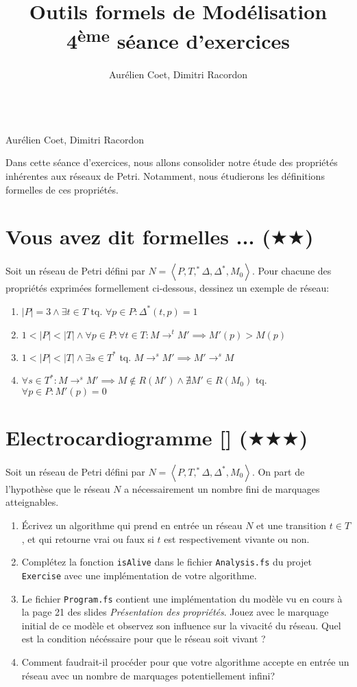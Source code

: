 \documentclass[a4paper, titlepage]{article}
\makeatletter
\numberwithin{figure}{section}
\numberwithin{table}{section}
\newcommand{\tuple}[1]{\ensuremath{\left \langle #1 \right \rangle }}
\newcommand{\card}[1]{\ensuremath{\left \vert #1 \right \vert }}
\newcommand\objective[1]{\def\@objective{#1}}
\newcommand{\makecustomtitle}{%
	\begin{center}
		\huge\@title \\
		[1ex]\small Aurélien Coet, Dimitri Racordon
	\end{center}
	\@objective
}
\makeatother
\begin{document}
  \title{Outils formels de Modélisation \\ 4\textsuperscript{ème} séance d'exercices}
  \author{Aurélien Coet, Dimitri Racordon}
	\objective{
		Dans cette séance d'exercices, nous allons consolider notre étude des propriétés inhérentes aux réseaux de Petri.
    Notamment, nous étudierons les définitions formelles de ces propriétés.
	}

	\makecustomtitle

  \section{Vous avez dit formelles ... ($\bigstar\bigstar$)}
    Soit un réseau de Petri défini par $N=\tuple{P,T,^*\Delta,\Delta^*,M_0}$.
		Pour chacune des propriétés exprimées formellement ci-dessous, dessinez un exemple de réseau:
		\begin{enumerate}
			\item $|P|=3 \wedge \exists t \in T$ tq. $\forall p \in P: \Delta^*(t,p) = 1$
			\item $1 < \card{P} < \card{T} \wedge \forall p \in P: \forall t \in T: M \rightarrow^t M' \implies M'(p) > M(p)$
      \item $1 < \card{P} < \card{T} \wedge \exists s \in T^*$ tq. $M \rightarrow^s M' \implies M' \rightarrow^s M$
      \item $\forall s \in T^*: M \rightarrow^s M' \implies M \notin R(M') \wedge \nexists M' \in R(M_0)$ tq. $\forall p \in P: M'(p) = 0$
		\end{enumerate}

	\section{Electrocardiogramme [\Keyboard] ($\bigstar\bigstar\bigstar$)}
    Soit un réseau de Petri défini par $N=\tuple{P,T,^*\Delta,\Delta^*,M_0}$.
    On part de l'hypothèse que le réseau $N$ a nécessairement un nombre fini de marquages atteignables.
    
    \begin{enumerate}
        \item Écrivez un algorithme qui prend en entrée un réseau $N$ et une transition $t \in T$, et qui retourne vrai ou faux si $t$ est respectivement vivante ou non.
        \item Complétez la fonction \texttt{isAlive} dans le fichier \texttt{Analysis.fs} du projet \texttt{Exercise} avec une implémentation de votre algorithme.
        \item Le fichier \texttt{Program.fs} contient une implémentation du modèle vu en cours à la page 21 des slides \textit{Présentation des propriétés}. 
        Jouez avec le marquage initial de ce modèle et observez son influence sur la vivacité du réseau.
        Quel est la condition nécéssaire pour que le réseau soit vivant ? 
        \item Comment faudrait-il procéder pour que votre algorithme accepte en entrée un réseau avec un nombre de marquages potentiellement infini?
    \end{enumerate}
\end{document}
